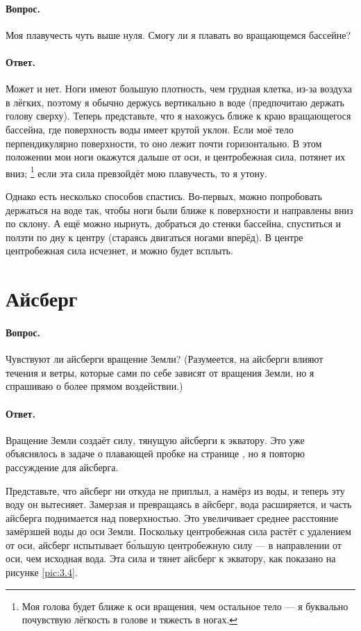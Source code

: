 \paragraph{Вопрос.}
Моя плавучесть чуть выше нуля. Смогу ли я плавать во вращающемся бассейне?

\paragraph{Ответ.}
Может и нет.
Ноги имеют большую плотность, чем грудная клетка, из-за воздуха в лёгких, поэтому я обычно держусь вертикально в воде (предпочитаю держать голову сверху).
Теперь представьте, что я нахожусь ближе к краю вращающегося бассейна, где поверхность воды имеет крутой уклон. Если моё тело перпендикулярно поверхности, то оно лежит почти горизонтально.
В этом положении мои ноги окажутся дальше от оси, и центробежная сила, потянет их вниз;%
\footnote{Моя голова будет ближе к оси вращения, чем остальное тело --- я буквально почувствую лёгкость в голове и тяжесть в ногах.}
если эта сила превзойдёт мою плавучесть, то я утону.

Однако есть несколько способов спастись.
Во-первых, можно попробовать держаться на воде так, чтобы ноги были ближе к поверхности и направлены вниз по склону.
А ещё можно нырнуть, добраться до стенки бассейна, спуститься и ползти по дну к центру (стараясь двигаться ногами вперёд).
В центре центробежная сила исчезнет, и можно будет всплыть.

\section{Айсберг}\label{sec:iceberg}

\paragraph{Вопрос.} Чувствуют ли айсберги вращение Земли?
(Разумеется, на айсберги влияют течения и ветры, которые сами по себе зависят от вращения Земли, но я спрашиваю о более прямом воздействии.)

\paragraph{Ответ.}
Вращение Земли создаёт силу, тянущую айсберги к экватору.
Это уже объяснялось в задаче о плавающей пробке на странице \pageref{sec:cork},
но я повторю рассуждение для айсберга.

Представьте, что айсберг ни откуда не приплыл, а намёрз из воды, и теперь эту воду он вытесняет.
Замерзая и превращаясь в айсберг, вода расширяется, и часть айсберга поднимается над поверхностью.
Это увеличивает среднее расстояние замёрзшей воды до оси Земли.
Поскольку центробежная сила растёт с удалением от оси, айсберг испытывает б\'{о}льшую центробежную силу — в направлении от оси, чем исходная вода.
Эта сила и тянет айсберг к экватору, как показано на рисунке \ref{pic:3.4}.

